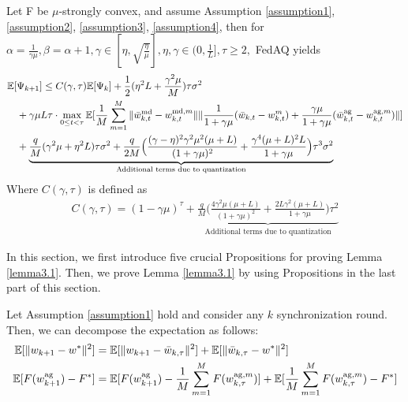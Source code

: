 \begin{lemma} \label{lemma3.1}
 Let F be $\mu$-strongly convex, and assume Assumption \ref{assumption1}, \ref{assumption2}, \ref{assumption3}, \ref{assumption4}, then for $\alpha=\frac{1}{\gamma\mu}, \beta=\alpha+1, \gamma \in [\eta, \sqrt{\frac{\eta}{\mu}}], \eta, \gamma \in (0, \frac{1}{L}], \tau \geq 2, $ FedAQ yields
 \begin{align*}
     \mathbb{E}[&\Psi_{k+1}] \leq C(\gamma, \tau) \mathbb{E}[\Psi_k] + \frac{1}{2}(\eta^2 L+\frac{\gamma^2\mu}{M})\tau\sigma^2 \\
     &+ \gamma\mu L \tau \cdot \max_{0\leq t <\tau} \mathbb{E}[\frac{1}{M} \sum_{m=1}^M \|\Bar{w}_{k, t}^{\textrm{md}} - w_{k, t}^{\textrm{md}, m}\| \|\frac{1}{1+\gamma\mu}(\Bar{w}_{k, t} - w_{k, t}^m) + \frac{\gamma\mu}{1+\gamma\mu}(\Bar{w}_{k, t}^{\textrm{ag}} - w_{k, t}^{\textrm{ag}, m})\|] \\
     &+ \underbrace{\frac{q}{M}(\gamma^2\mu+\eta^2 L)\tau\sigma^2 + \frac{q}{2M}\Big(\frac{(\gamma-\eta)^2\gamma^2\mu^2(\mu+L)}{(1+\gamma\mu)^2} + \frac{\gamma^4(\mu+L)^2 L}{1+\gamma\mu}\Big)\tau^3\sigma^2}_{\textrm{Additional terms due to quantization}}
 \end{align*}
 Where $C(\gamma, \tau)$ is defined as
 \begin{align*}
     C(\gamma, \tau) = (1-\gamma\mu)^\tau + \underbrace{\frac{q}{M}\Big( \frac{4\gamma^2\mu(\mu + L)}{(1+\gamma\mu)^2} + \frac{2L\gamma^2(\mu+L)}{1+\gamma\mu}\Big)\tau^2}_{\textrm{Additional terms due to quantization}}
 \end{align*}
\end{lemma}


In this section, we first introduce five crucial Propositions for proving Lemma \ref{lemma3.1}. Then, we prove Lemma \ref{lemma3.1} by using Propositions in the last part of this section.
\begin{proposition} \label{proposition3.2}
Let Assumption \ref{assumption1} hold and consider any $k$ synchronization round. Then, we can decompose the expectation as follows:
\begin{align*}
    \mathbb{E}[\|w_{k+1} - w^*\|^2] &= \mathbb{E}[\|w_{k+1} - \Bar{w}_{k, \tau}\|^2] + \mathbb{E}[\|\Bar{w}_{k, \tau} - w^*\|^2] \\
    \mathbb{E}[F(w_{k+1}^{\textrm{ag}}) - F^*] &= \mathbb{E}[F(w_{k+1}^{\textrm{ag}}) - \frac{1}{M} \sum_{m=1}^M F(w_{k, \tau}^{\textrm{ag}, m})] + \mathbb{E}[\frac{1}{M} \sum_{m=1}^M F(w_{k, \tau}^{\textrm{ag}, m}) - F^*]
\end{align*}
\end{proposition}

